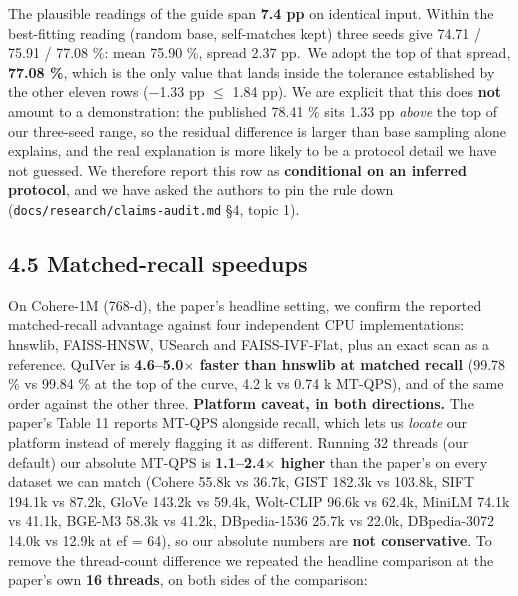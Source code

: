 \documentclass[
  10pt,
]{article}
\begin{document}
The plausible readings of the guide span \textbf{7.4 pp} on identical
input. Within the best-fitting reading (random base, self-matches kept)
three seeds give 74.71 / 75.91 / 77.08 \%: mean 75.90 \%, spread 2.37
pp.~We adopt the top of that spread, \textbf{77.08 \%}, which is the
only value that lands inside the tolerance established by the other
eleven rows ($-$1.33 pp $\leq$ 1.84 pp). We are explicit that this does
\textbf{not} amount to a demonstration: the published 78.41 \% sits 1.33
pp \emph{above} the top of our three-seed range, so the residual
difference is larger than base sampling alone explains, and the real
explanation is more likely to be a protocol detail we have not guessed.
We therefore report this row as \textbf{conditional on an inferred
protocol}, and we have asked the authors to pin the rule down
(\texttt{docs/research/claims-audit.md} §4, topic 1).

\subsection{4.5 Matched-recall speedups}\label{matched-recall-speedups}

On Cohere-1M (768-d), the paper's headline setting, we confirm the
reported matched-recall advantage against four independent CPU
implementations: hnswlib, FAISS-HNSW, USearch and FAISS-IVF-Flat, plus
an exact scan as a reference. QuIVer is \textbf{4.6--5.0$\times$ faster than
hnswlib at matched recall} (99.78 \% vs 99.84 \% at the top of the
curve, 4.2 k vs 0.74 k MT-QPS), and of the same order against the other
three. \textbf{Platform caveat, in both directions.} The paper's Table
11 reports MT-QPS alongside recall, which lets us \emph{locate} our
platform instead of merely flagging it as different. Running 32 threads
(our default) our absolute MT-QPS is \textbf{1.1--2.4$\times$ higher} than the
paper's on every dataset we can match (Cohere 55.8k vs 36.7k, GIST
182.3k vs 103.8k, SIFT 194.1k vs 87.2k, GloVe 143.2k vs 59.4k, Wolt-CLIP
96.6k vs 62.4k, MiniLM 74.1k vs 41.1k, BGE-M3 58.3k vs 41.2k,
DBpedia-1536 25.7k vs 22.0k, DBpedia-3072 14.0k vs 12.9k at ef = 64), so
our absolute numbers are \textbf{not conservative}. To remove the
thread-count difference we repeated the headline comparison at the
paper's own \textbf{16 threads}, on both sides of the comparison:
\end{document}
